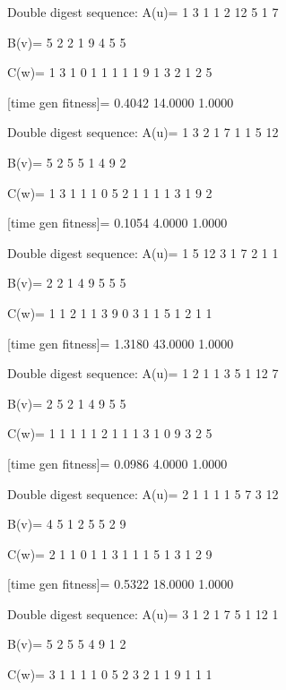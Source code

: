 Double digest sequence:
A(u)=
     1     3     1     1     2    12     5     1     7

B(v)=
     5     2     2     1     9     4     5     5

C(w)=
     1     3     1     0     1     1     1     1     1     9     1     3     2     1     2     5

[time gen fitness]=
    0.4042   14.0000    1.0000

Double digest sequence:
A(u)=
     1     3     2     1     7     1     1     5    12

B(v)=
     5     2     5     5     1     4     9     2

C(w)=
     1     3     1     1     1     0     5     2     1     1     1     1     3     1     9     2

[time gen fitness]=
    0.1054    4.0000    1.0000

Double digest sequence:
A(u)=
     1     5    12     3     1     7     2     1     1

B(v)=
     2     2     1     4     9     5     5     5

C(w)=
     1     1     2     1     1     3     9     0     3     1     1     5     1     2     1     1

[time gen fitness]=
    1.3180   43.0000    1.0000

Double digest sequence:
A(u)=
     1     2     1     1     3     5     1    12     7

B(v)=
     2     5     2     1     4     9     5     5

C(w)=
     1     1     1     1     1     2     1     1     1     3     1     0     9     3     2     5

[time gen fitness]=
    0.0986    4.0000    1.0000

Double digest sequence:
A(u)=
     2     1     1     1     1     5     7     3    12

B(v)=
     4     5     1     2     5     5     2     9

C(w)=
     2     1     1     0     1     1     3     1     1     1     5     1     3     1     2     9

[time gen fitness]=
    0.5322   18.0000    1.0000

Double digest sequence:
A(u)=
     3     1     2     1     7     5     1    12     1

B(v)=
     5     2     5     5     4     9     1     2

C(w)=
     3     1     1     1     1     0     5     2     3     2     1     1     9     1     1     1

